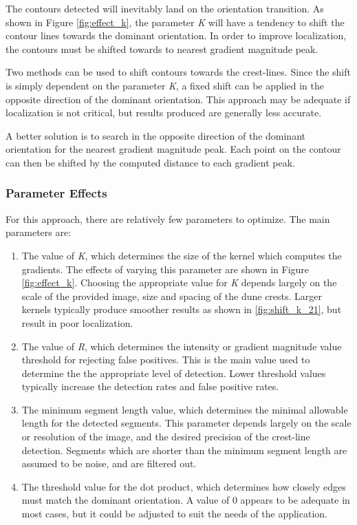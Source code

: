 The contours detected will inevitably land on the orientation transition. As shown in Figure \ref{fig:effect_k}, the parameter \emph{K} will have a tendency to shift the contour lines towards the dominant orientation. In order to improve localization, the contours must be shifted towards to nearest gradient magnitude peak. 

Two methods can be used to shift contours towards the crest-lines. Since the shift is simply dependent on the parameter \emph{K}, a fixed shift can be applied in the opposite direction of the dominant orientation. This approach may be adequate if localization is not critical, but results produced are generally less accurate.

A better solution is to search in the opposite direction of the dominant orientation for the nearest gradient magnitude peak. Each point on the contour can then be shifted by the computed distance to each gradient peak.

\subsubsection*{Parameter Effects}

For this approach, there are relatively few parameters to optimize. The main parameters are:

\begin{enumerate}
	\item The value of \emph{K}, which determines the size of the kernel which computes the gradients. The effects of varying this parameter are shown in Figure \ref{fig:effect_k}. Choosing the appropriate value for \emph{K} depends largely on the scale of the provided image, size and spacing of the dune crests. Larger kernels typically produce smoother results as shown in \ref{fig:shift_k_21}, but result in poor localization.
	\item  The value of \emph{R}, which determines the intensity or gradient magnitude value threshold for rejecting false positives. This is the main value used to determine the the appropriate level of detection. Lower threshold values typically increase the detection rates and false positive rates.
	\item The minimum segment length value, which determines the minimal allowable length for the detected segments. This parameter depends largely on the scale or resolution of the image, and the desired precision of the crest-line detection. Segments which are shorter than the minimum segment length are assumed to be noise, and are filtered out.
	\item The threshold value for the dot product, which determines how closely edges must match the dominant orientation. A value of 0 appears to be adequate in most cases, but it could be adjusted to suit the needs of the application.
\end{enumerate}

